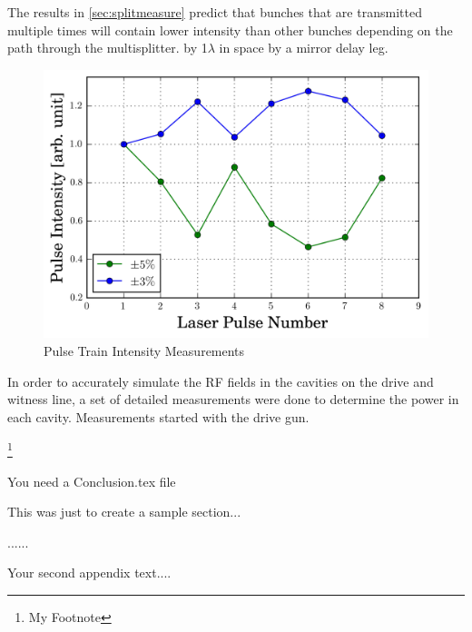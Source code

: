 \documentclass{iitthesis}
\begin{document}
 The results in \ref{sec:splitmeasure} predict that
bunches that are transmitted multiple times will contain lower intensity than other
bunches depending on the path through the multisplitter.
by 1$\lambda$ in space by a mirror delay leg. 

\begin{figure}[h]
	\begin{center}
		\includegraphics[width=1.0\textwidth]{images/splitter_improvement}\caption{Pulse Train Intensity Measurements}
	\end{center}
	\label{fig:origtrain}
\end{figure}


In order to accurately simulate the RF fields in the cavities on the drive and witness line, 
a set of detailed measurements were done to determine the power in each cavity. 
Measurements started with the drive gun. 

\footnote{My Footnote} 





%   
You need a Conclusion.tex file



This was just to create a sample section...

\clearpage


%
%
\appendix


......



Your second appendix text....

\newpage
%
%


\end{document}
